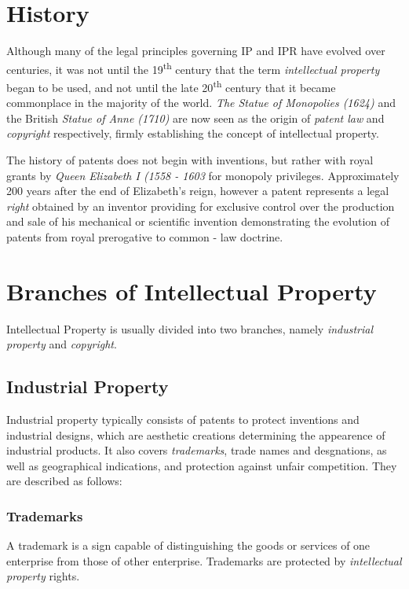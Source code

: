 \documentclass[a4paper,11pt]{article}
\begin{document}
\section{History}
Although many of the legal principles governing IP and IPR have evolved over
centuries, it was not until the 19\textsuperscript{th} century that the term \emph{intellectual
property} began to be used, and not until the late 20\textsuperscript{th}
century that it became commonplace in the majority of the world.\cite{ipweb}
\emph{The Statue of Monopolies (1624)}\cite{statueofmonopolies} and the British
\emph{Statue of Anne (1710)}\cite{statueofanne} are now seen as the origin of
\emph{patent law}\cite{patentlaw} and \emph{copyright}\cite{copyrightlaw}
respectively,\cite{ipweb} firmly establishing the concept of intellectual
property.

The history of patents does not begin with inventions, but rather with royal
grants by \emph{Queen Elizabeth I (1558 - 1603}\cite{queenelizabethi} for monopoly privileges.
Approximately 200 years after the end of Elizabeth's reign, however a
patent represents a legal \emph{right}\cite{legalright} obtained by an inventor
providing for exclusive control over the production and sale of his mechanical
or scientific invention demonstrating the evolution of patents from royal
prerogative to common - law doctrine.

\section{Branches of Intellectual Property}
Intellectual Property is usually divided into two branches, namely
\emph{industrial property}\cite{industrialpropertylaw} and
\emph{copyright}\cite{copyrightlaw}.

\subsection{Industrial Property}
Industrial property typically consists of patents to protect inventions and
industrial designs, which are aesthetic creations determining the appearence of
industrial products. It also covers \emph{trademarks}\cite{trademarks}, trade names and desgnations, as
well as geographical indications, and protection against unfair competition.
They are described as follows:

\subsubsection{Trademarks}
A trademark is a sign capable of distinguishing the goods or services of one
enterprise from those of other enterprise. Trademarks are protected by
\emph{intellectual property}\cite{ipweb} rights.
\end{document}
